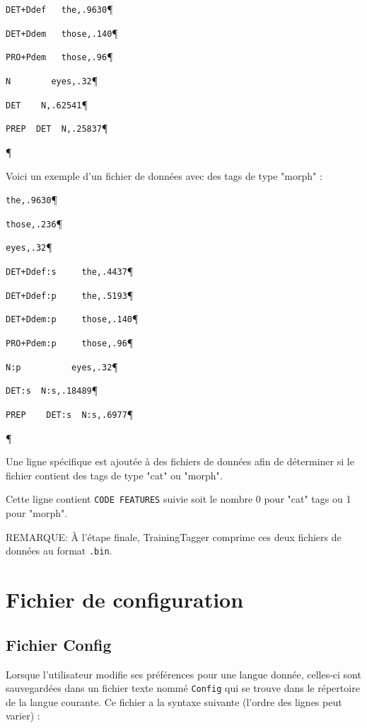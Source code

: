\verb$DET+Ddef	 the,.9630$\P

\verb$DET+Ddem	 those,.140$\P

\verb$PRO+Pdem	 those,.96$\P

\verb+N		   eyes,.32+\P

\verb+DET	 N,.62541+\P

\verb+PREP	DET  N,.25837+\P

\P

\bigskip

\noindent Voici un exemple d'un fichier de données avec des tags de type "morph" :

\bigskip
\verb+the,.9630+\P

\verb+those,.236+\P

\verb+eyes,.32+\P

\verb$DET+Ddef:s	 the,.4437$\P

\verb$DET+Ddef:p	 the,.5193$\P

\verb$DET+Ddem:p	 those,.140$\P

\verb$PRO+Pdem:p	 those,.96$\P

\verb+N:p		   eyes,.32+\P

\verb+DET:s	 N:s,.18489+\P

\verb+PREP	  DET:s  N:s,.6977+\P

\P

\bigskip
\noindent Une ligne spécifique est ajoutée à des fichiers de données afin de déterminer si le fichier contient des tags de type "cat" ou "morph".

Cette ligne contient \verb+CODE FEATURES+ suivie soit le nombre 0 pour "cat" tags ou 1 pour
"morph".

\bigskip
\noindent REMARQUE: À l'étape finale, TrainingTagger comprime ces deux fichiers de données au format \verb+.bin+.


\section{Fichier de configuration}
\subsection{Fichier Config}
Lorsque l’utilisateur modifie ses préférences pour une langue donnée, celles-ci sont sauvegardées
dans un fichier texte nommé \verb+Config+ qui se trouve dans le répertoire de la langue courante. Ce
fichier a la syntaxe suivante (l’ordre des lignes peut varier) :



